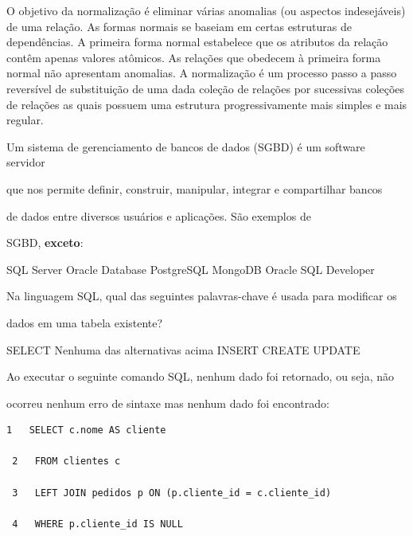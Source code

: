 \documentclass[12pt, addpoints]{exam}
\begin{document}
\begin{questions}
\begin{choices}
\choice O objetivo da normalização é eliminar várias anomalias (ou aspectos indesejáveis) de uma relação.
\choice As formas normais se baseiam em certas estruturas de dependências.
\choice A primeira forma normal estabelece que os atributos da relação contêm apenas valores atômicos.
\choice As relações que obedecem à primeira forma normal não apresentam anomalias.
\choice A normalização é um processo passo a passo reversível de substituição de uma dada coleção de relações por sucessivas coleções de relações as quais possuem uma estrutura progressivamente mais simples e mais regular.
\end{choices}

\question

Um sistema de gerenciamento de bancos de dados (SGBD) é um software servidor

que nos permite definir, construir, manipular, integrar e compartilhar bancos

de dados entre diversos usuários e aplicações. São exemplos de

SGBD, \textbf{exceto}:
\begin{choices}
\choice SQL Server
\choice Oracle Database
\choice PostgreSQL
\choice MongoDB
\choice Oracle SQL Developer
\end{choices}

\question

Na linguagem SQL, qual das seguintes palavras-chave é usada para modificar os

dados em uma tabela existente?


\begin{choices}
\choice SELECT
\choice Nenhuma das alternativas acima
\choice INSERT
\choice CREATE
\choice UPDATE
\end{choices}

\question

Ao executar o seguinte comando SQL, nenhum dado foi retornado, ou seja, não

ocorreu nenhum erro de sintaxe mas nenhum dado foi encontrado:

\begin{tcolorbox}

 \begin{verbatim}1   SELECT c.nome AS cliente

 2   FROM clientes c

 3   LEFT JOIN pedidos p ON (p.cliente_id = c.cliente_id)

 4   WHERE p.cliente_id IS NULL


\end{verbatim}
\end{tcolorbox}
\end{questions}
\end{document}
